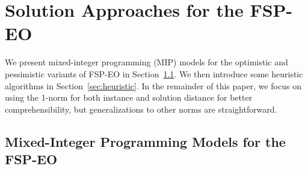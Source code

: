 \documentclass[11pt, a4paper]{article}
\newcommand{\fspeo}{FSP-EO\xspace}
\newcommand{\FRil}[1]{\todo[color=black, textcolor=white, inline, author=FR]{#1}}
\begin{document}














\section{Solution Approaches for the \fspeo}
\label{sec:methods}

We present mixed-integer programming (MIP) models for the optimistic and pessimistic variants of \fspeo in Section~\ref{sec:models}. We then introduce some heuristic algorithms in Section~\ref{sec:heuristic}. In the remainder of this paper, we focus on using the 1-norm for both instance and solution distance for better comprehensibility, but generalizations to other norms are straightforward.

\subsection{Mixed-Integer Programming Models for the \fspeo}
\label{sec:models}
\end{document}
